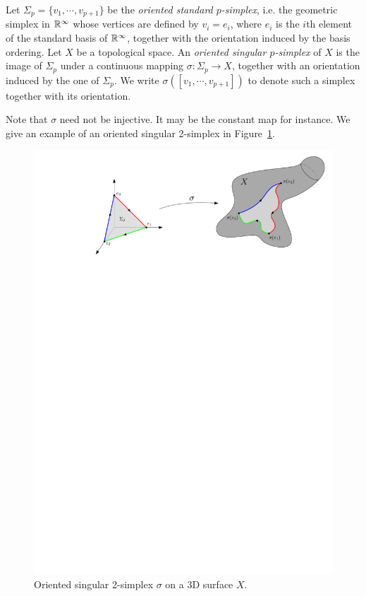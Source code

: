 \begin{defin}
Let $\Sigma_p=\{v_1,\cdots,v_{p+1}\}$ be the {\em oriented standard $p$-simplex}, i.e. the geometric simplex in $\mathbb{R}^{\infty}$
whose vertices are defined by $v_i=e_i$, where $e_i$ is the $i$th element of the standard basis %
of $\mathbb{R}^{\infty}$, %
together with the orientation induced by the basis ordering. %
Let $X$ be a topological space. An {\em oriented singular $p$-simplex} of $X$ is the image of $\Sigma_p$ under a 
continuous mapping $\sigma:\Sigma_p\rightarrow X$,
together with an orientation induced by the one of $\Sigma_p$.
We write $\sigma([v_1,\cdots,v_{p+1}])$ to denote such a simplex together with its orientation. 
\end{defin}

Note that $\sigma$ need not be injective. It may be the constant map for instance. We give an example of an
oriented singular 2-simplex in Figure~\ref{fig:ExampleSing}.

\begin{figure}\centering
\includegraphics[width=13cm]{figures/ExampleSingularSimplex}
\caption[Singular simplex]{\label{fig:ExampleSing} Oriented singular 2-simplex $\sigma$ on a 3D surface $X$.}
\end{figure} 


